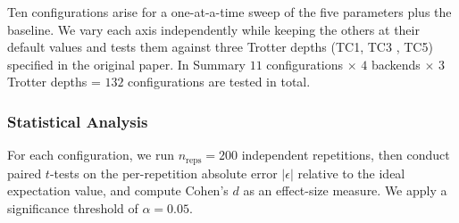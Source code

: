 \documentclass[10pt,conference]{IEEEtran}
\begin{document}
Ten configurations arise for a one-at-a-time sweep of the five parameters plus the baseline. We vary each axis independently while keeping the others at their default values and tests them against three Trotter depths (TC1, TC3 , TC5) specified in the original paper. In Summary $11$ configurations $\times$ $4$ backends $\times$ $3$ Trotter depths = $132$ configurations are tested in total.

\subsubsection{Statistical Analysis}
For each configuration, we run $n_\text{reps} = 200$ independent repetitions, then conduct paired $t$-tests on the per-repetition absolute error $|\epsilon|$ relative to the ideal expectation value, and compute Cohen's $d$ as an effect-size measure. We apply a significance threshold of $\alpha = 0.05$. 
\end{document}
